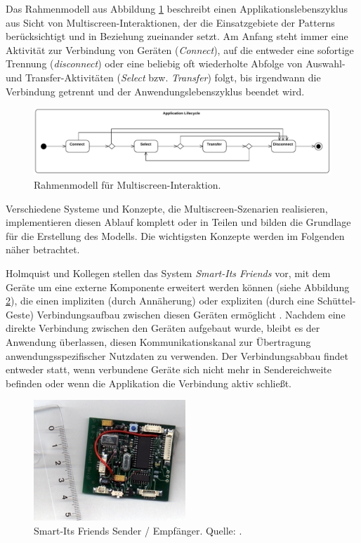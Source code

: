 Das Rahmenmodell aus Abbildung \ref{fig:model_overview} beschreibt einen Applikationslebenszyklus aus Sicht von Multiscreen-Interaktionen, der die Einsatzgebiete der Patterns berücksichtigt und in Beziehung zueinander setzt. Am Anfang steht immer eine Aktivität zur Verbindung von Geräten (\textit{Connect}), auf die entweder eine sofortige Trennung (\textit{disconnect}) oder eine beliebig oft wiederholte Abfolge von Auswahl- und Transfer-Aktivitäten (\textit{Select} bzw. \textit{Transfer}) folgt, bis irgendwann die Verbindung getrennt und der Anwendungslebenszyklus beendet wird.
\begin{figure}[h]
\centering
\includegraphics[page=1,width=1\textwidth]{bilder/lifecycle.pdf}
\caption{Rahmenmodell für Multiscreen-Interaktion.}
\label{fig:model_overview}
\end{figure}
Verschiedene Systeme und Konzepte, die Multiscreen-Szenarien realisieren, implementieren diesen Ablauf komplett oder in Teilen und bilden die Grundlage für die Erstellung des Modells. Die wichtigsten Konzepte werden im Folgenden näher betrachtet.

Holmquist und Kollegen stellen das System \textit{Smart-Its Friends} vor, mit dem Geräte um eine externe Komponente erweitert werden können (siehe Abbildung \ref{fig:smart_its_friends}), die einen impliziten (durch Annäherung) oder expliziten (durch eine Schüttel-Geste) Verbindungsaufbau zwischen diesen Geräten ermöglicht \citep{Holmquist2001}. Nachdem eine direkte Verbindung zwischen den Geräten aufgebaut wurde, bleibt es der Anwendung überlassen, diesen Kommunikationskanal zur Übertragung anwendungsspezifischer Nutzdaten zu verwenden. Der Verbindungsabbau findet entweder statt, wenn verbundene Geräte sich nicht mehr in Sendereichweite befinden oder wenn die Applikation die Verbindung aktiv schließt.
\begin{figure}[h]
\centering
\includegraphics[scale=1]{bilder/smart_its_friends.png}
\caption{Smart-Its Friends Sender / Empfänger. Quelle: \citep{Holmquist2001}.}
\label{fig:smart_its_friends}
\end{figure}

